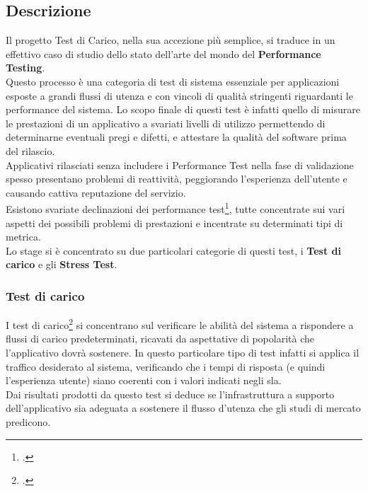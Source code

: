 \subsection{Descrizione}
Il progetto Test di Carico, nella sua accezione più semplice, si traduce in un effettivo caso di studio dello stato dell'arte del mondo del \textbf{Performance Testing}. \\
Questo processo è una categoria di test di sistema essenziale per applicazioni esposte a grandi flussi di utenza e con vincoli di qualità stringenti riguardanti le performance del sistema. Lo scopo finale di questi test è infatti quello di misurare le prestazioni di un applicativo a svariati livelli di utilizzo permettendo di determinarne eventuali pregi e difetti, e attestare la qualità del software prima del rilascio. \\
Applicativi rilasciati senza includere i Performance Test nella fase di validazione spesso presentano problemi di reattività, peggiorando l'esperienza dell'utente e causando cattiva reputazione del servizio. \\
Esistono svariate declinazioni dei performance test\footcite{article:performancetest}, tutte concentrate sui vari aspetti dei possibili problemi di prestazioni e incentrate su determinati tipi di metrica. \\
Lo stage si è concentrato su due particolari categorie di questi test, i \textbf{Test di carico} e gli \textbf{Stress Test}.
\subsubsection{Test di carico}
I test di carico\footcite{article:loadtest} si concentrano sul verificare le abilità del sistema a rispondere a flussi di carico predeterminati, ricavati da aspettative di popolarità che l'applicativo dovrà sostenere. In questo particolare tipo di test infatti si applica il traffico desiderato al sistema, verificando che i tempi di risposta (e quindi l'esperienza utente) siano coerenti con i valori indicati negli \gls{sla}. \\
Dai risultati prodotti da questo test si deduce se l'infrastruttura a supporto dell'applicativo sia adeguata a sostenere il flusso d'utenza che gli studi di mercato predicono.
